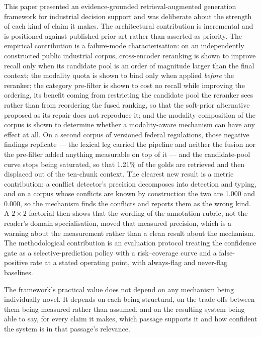 \documentclass[preprint,3p,times]{elsarticle}
\begin{document}
This paper presented an evidence-grounded retrieval-augmented generation
framework for industrial decision support and was deliberate about the strength
of each kind of claim it makes. The architectural contribution is incremental
and is positioned against published prior art rather than asserted as priority.
The empirical contribution is a failure-mode characterisation: on an
independently constructed public industrial corpus, cross-encoder reranking is
shown to improve recall only when its candidate pool is an order of magnitude
larger than the final context; the modality quota is shown to bind only when
applied \emph{before} the reranker; the category pre-filter is shown to cost no
recall while improving the ordering, its benefit coming from restricting the
candidate pool the reranker sees rather than from reordering the fused ranking,
so that the soft-prior alternative proposed as its repair does not reproduce it;
and the modality composition of the corpus is
shown to determine whether a modality-aware mechanism can have any effect at
all. On a second corpus of versioned federal regulations, those negative
findings replicate --- the lexical leg carried the pipeline and neither the
fusion nor the pre-filter added anything measurable on top of it --- and the
candidate-pool curve stops being saturated, so that
1.21\% of the golds are retrieved and then displaced
out of the ten-chunk context. The clearest new result is a metric
contribution: a conflict detector's precision decomposes into detection and
typing, and on a corpus whose conflicts are known by construction the two are
1.000 and 0.000, so the
mechanism finds the conflicts and reports them as the wrong kind. A $2\times
2$ factorial then shows that the wording of the annotation rubric, not the
reader's domain specialisation, moved that measured precision, which is a
warning about the measurement rather than a clean result about the mechanism.
The methodological contribution is an evaluation protocol treating the
confidence gate as a selective-prediction policy with a risk--coverage curve
and a false-positive rate at a stated operating point, with always-flag and
never-flag baselines.

The framework's practical value does not depend on any mechanism being
individually novel. It depends on each being structural, on the trade-offs
between them being measured rather than assumed, and on the resulting system
being able to say, for every claim it makes, which passage supports it and how
confident the system is in that passage's relevance.
\end{document}
